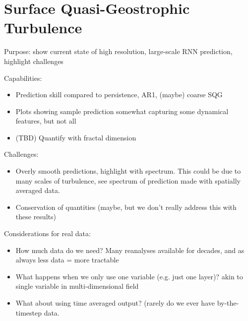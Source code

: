 \section{Surface Quasi-Geostrophic Turbulence}
\label{sec:sqg}

Purpose: show current state of high resolution, large-scale RNN prediction,
highlight challenges

Capabilities:
\begin{itemize}
    \item Prediction skill compared to persistence, AR1, (maybe) coarse SQG
    \item Plots showing sample prediction somewhat capturing some dynamical
        features, but not all
    \item (TBD) Quantify with fractal dimension
\end{itemize}

Challenges:
\begin{itemize}
    \item Overly smooth predictions, highlight with spectrum. This could be due
        to many scales of turbulence, see spectrum of prediction made with
        spatially averaged data.
    \item Conservation of quantities (maybe, but we don't really address this
        with these results)
\end{itemize}

Considerations for real data:
\begin{itemize}
    \item How much data do we need? Many reanalyses available for decades, and
        as always less data = more tractable
    \item What happens when we only use one variable (e.g. just one layer)? akin
        to single variable in multi-dimensional field
    \item What about using time averaged output? (rarely do we ever have
        by-the-timestep data.
\end{itemize}
